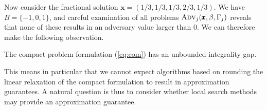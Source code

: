 Now consider the fractional solution $\pmb{x}=(1/3,1/3,1/3,2/3,1/3)$. We have $B=\{-1,0,1\}$, and careful examination of all problems $\textsc{Adv}_j(\pmb{x},\beta,\Gamma_j)$ reveals that none of these results in an adversary value larger than 0. We can therefore make the following observation.

\begin{observation}
The compact problem formulation (\ref{eq:com}) has an unbounded integrality gap.
\end{observation}

This means in particular that we cannot expect algorithms based on rounding the linear relaxation of the compact formulation to result in approximation guarantees. A natural question is thus to consider whether local search methods may provide an approximation guarantee. 







